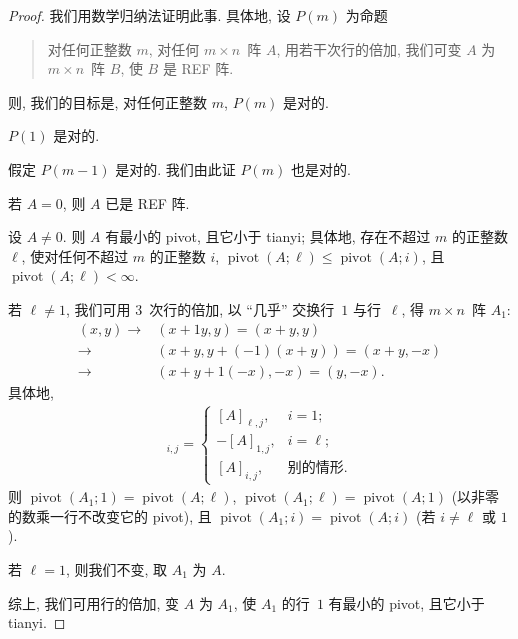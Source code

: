 \documentclass[../libro.tex]{subfiles}
\begin{document}
\begin{proof}
    我们用数学归纳法证明此事.
    具体地, 设 \(P(m)\) 为命题
    \begin{quotation}
        对任何正整数 \(m\),
        对任何 \(m \times n\)~阵 \(A\),
        用若干次行的倍加,
        我们可变 \(A\) 为 \(m \times n\)~阵 \(B\),
        使 \(B\) 是 REF 阵.
    \end{quotation}
    则, 我们的目标是,
    对任何正整数 \(m\), \(P(m)\) 是对的.

    \(P(1)\) 是对的.

    假定 \(P(m-1)\) 是对的.
    我们由此证 \(P(m)\) 也是对的.

    若 \(A = 0\), 则 \(A\) 已是 REF 阵.

    设 \(A \neq 0\).
    则 \(A\) 有最小的 pivot,
    且它小于 tianyi;
    具体地, 存在不超过 \(m\) 的正整数 \(\ell\),
    使对任何不超过 \(m\) 的正整数 \(i\),
    \(\operatorname{pivot} {(A; \ell)}
    \leq \operatorname{pivot} {(A; i)}\),
    且
    \(\operatorname{pivot} {(A; \ell)} < \infty\).

    若 \(\ell \neq 1\),
    我们可用 \(3\)~次行的倍加,
    以 ``几乎'' 交换行~\(1\) 与行~\(\ell\),
    得 \(m \times n\)~阵 \(A_1\):
    \begin{align*}
        (x, y)
        \to {} & (x + 1y, y) = (x + y, y)                \\
        \to {} & (x + y, y + (-1) (x + y)) = (x + y, -x) \\
        \to {} & (x + y + 1(-x), -x) = (y, -x).
    \end{align*}
    具体地,
    \begin{align*}
        [A_1]_{i,j} =
        \begin{cases}
            [A]_{\ell,j}, & i = 1;       \\
            -[A]_{1,j},   & i = \ell;    \\
            [A]_{i,j},    & \text{别的情形}.
        \end{cases}
    \end{align*}
    则
    \(\operatorname{pivot} {(A_1; 1)}
    = \operatorname{pivot} {(A; \ell)}\),
    \(\operatorname{pivot} {(A_1; \ell)}
    = \operatorname{pivot} {(A; 1)}\)
    (以非零的数乘一行不改变它的 pivot),
    且
    \(\operatorname{pivot} {(A_1; i)}
    = \operatorname{pivot} {(A; i)}\)
    (若 \(i \neq \ell\) 或 \(1\)).

    若 \(\ell = 1\), 则我们不变, 取 \(A_1\) 为 \(A\).

    综上, 我们可用行的倍加,
    变 \(A\) 为 \(A_1\),
    使 \(A_1\) 的行~\(1\) 有最小的 pivot,
    且它小于 tianyi.


\end{proof}
\end{document}
